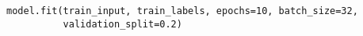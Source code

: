 \begin{verbatim}
model.fit(train_input, train_labels, epochs=10, batch_size=32,
          validation_split=0.2)
\end{verbatim}